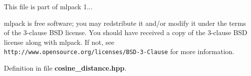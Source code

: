 This file is part of mlpack 1...

mlpack is free software; you may redstribute it and/or modify it under the terms of the 3-\/clause B\-S\-D license. You should have received a copy of the 3-\/clause B\-S\-D license along with mlpack. If not, see {\tt http\-://www.\-opensource.\-org/licenses/\-B\-S\-D-\/3-\/\-Clause} for more information. 

Definition in file {\bf cosine\-\_\-distance.\-hpp}.

